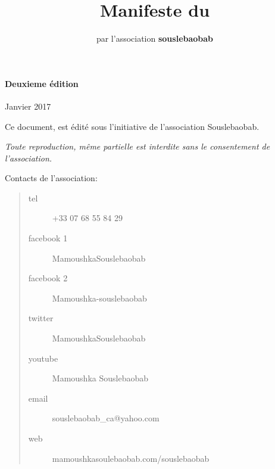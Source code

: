 \documentclass{manual}
\begin{document}
	
\dominitoc[c]	
\author{par l'association {\bfseries souslebaobab}}
\title{\Huge\textbf{Manifeste du \newline \newline  {\fontsize{59}{260}\sffamily\textcolor{darkgray}{  PANAFRICANISME}}}}


\frontmatter
\maketitle



\hfill \break
\vspace{300pt}
\paragraph{Deuxieme édition}
 \textcopyright Janvier 2017


Ce document, est édité sous l'initiative de l'association \textsf{Souslebaobab}.



\textit{Toute reproduction, même partielle est interdite sans le consentement de l'association.}
\hfill \break


{ Contacts de l'association:}
\begin{quote}
\begin{description}
	\item[tel]{ +33 07 68 55 84 29}
	\item[facebook 1]{ MamoushkaSouslebaobab}
	\item[facebook 2]{ Mamoushka-souslebaobab}
	\item[twitter]{ MamoushkaSouslebaobab}
	\item[youtube]{ Mamoushka Souslebaobab}
	\item[email]{ souslebaobab\_ca@yahoo.com}
	
	\item[web]{ mamoushkasoulebaobab.com/souslebaobab}
		
	\end{description}
\end{quote}



\tableofcontents
\mainmatter

	
	 
	
	
\end{document}
